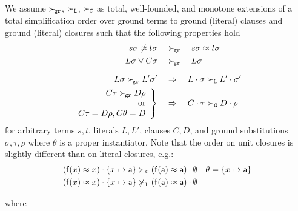 \begin{definition}

    We assume $\mathrel\succ_{\!\mathtt{gr}}$, $\mathrel\succ_{\mathtt{L}}$, $\mathrel\succ_{\mathtt{C}}$ as
        total, well-founded, and monotone extensions of a
        total simplification order over ground terms to ground (literal) clauses
        and ground (literal) closures such that the following properties hold
        \begin{align*}
            s\sigma\not\approx t\sigma \quad&\mathrel\succ_{\!\mathtt{gr}}\quad s\sigma\approx t\sigma
            \\
            L\sigma\lor C\sigma \quad&\mathrel\succ_{\!\mathtt{gr}}\quad L\sigma
            \\[0.7em]
            L\sigma \mathrel\succ_{\!\mathtt{gr}} L'\sigma'
            \quad&\Rightarrow\quad
            L\cdot\sigma \mathrel\succ_{\mathtt{L}} L'\cdot\sigma'
        \\
        \left.
        \begin{array}{r}
            C\tau\mathrel\succ_{\!\mathtt{gr}} D\rho\\
            \text{ or}
            \\
            C\tau=D\rho, C\theta=D
        \end{array}
        \right\}
            \quad&\Rightarrow\quad
            C\cdot\tau\mathrel\succ_{\mathtt{C}} D\cdot\rho
        \end{align*}
        for arbitrary terms $s,t$,
        literals $L, L'$,
        clauses $C,D$, and
        ground substitutions $\sigma, \tau, \rho$
        where $\theta$ is a proper instantiator.
        Note that the order on unit closures is slightly different than on literal closures, e.g.:
        \begin{align*}
            (\mathsf{f}(x)\approx x)\cdot\{ x\mapsto \mathsf{a}\}
            &\mathrel\succ_{\mathtt{C}}
            (\mathsf{f}(\mathsf{a})\approx\mathsf{a})\cdot\emptyset
            & \theta = \{ x\mapsto \mathsf{a} \}
        \\
        (\mathsf{f}(x)\approx x)\cdot\{ x\mapsto \mathsf{a}\}
        &\not\mathrel\succ_{\mathtt{L}}
        (\mathsf{f}(\mathsf{a})\approx\mathsf{a})\cdot\emptyset
        \end{align*}



\end{definition}

\begin{definition}
    
    where
    
    \end{definition}


